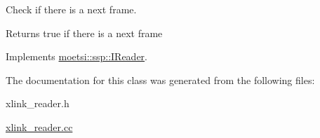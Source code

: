 Check if there is a next frame. 

\begin{DoxyReturn}{Returns}
true if there is a next frame 
\end{DoxyReturn}


Implements \hyperlink{classmoetsi_1_1ssp_1_1IReader_af9186ba41e136dc4ec3242b5dd55fa04}{moetsi\+::ssp\+::\+I\+Reader}.



The documentation for this class was generated from the following files\+:\begin{DoxyCompactItemize}
\item 
xlink\+\_\+reader.\+h\item 
\hyperlink{xlink__reader_8cc}{xlink\+\_\+reader.\+cc}\end{DoxyCompactItemize}
